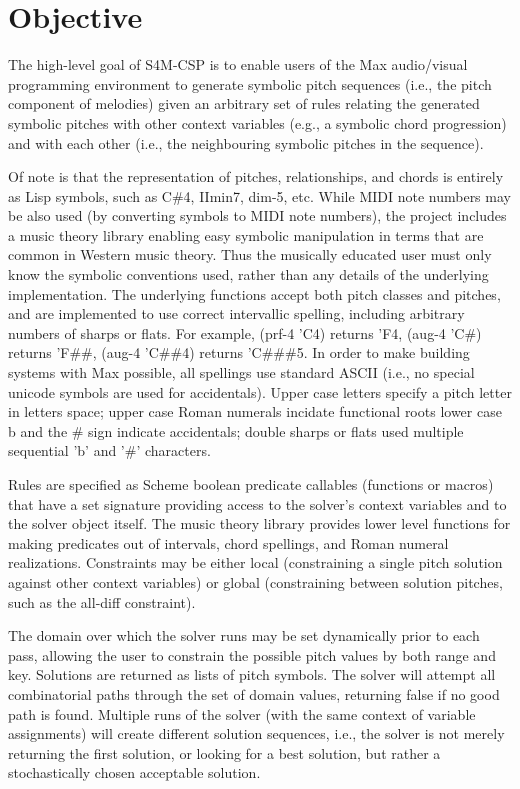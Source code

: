 \documentclass[pmlr]{jmlr}%
\begin{document}
\section{Objective}
\label{sec:intro}

The high-level goal of S4M-CSP is to enable users of the Max audio/visual 
programming environment to generate symbolic pitch sequences (i.e., the pitch component of melodies) 
given an arbitrary set of rules relating the generated symbolic pitches with other context
variables (e.g., a symbolic chord progression) and with each other (i.e., the neighbouring
symbolic pitches in the sequence). 

Of note is that the representation of pitches, relationships, and chords is entirely as Lisp symbols,
such as C\#4, IImin7, dim-5, etc. While MIDI note numbers may be also used (by converting symbols to MIDI note numbers),
the project includes a music theory library enabling easy symbolic manipulation in terms that are 
common in Western music theory.  Thus the musically educated user must only know the symbolic 
conventions used, rather than any details of the underlying implementation. The underlying functions
accept both pitch classes and pitches, and are implemented to use correct intervallic spelling, including
arbitrary numbers of sharps or flats. 
For example, (prf-4 'C4) returns 'F4, (aug-4 'C\#) returns 'F\#\#, (aug-4 'C\#\#4) returns 'C\#\#\#5.
In order to make building systems with Max possible, all spellings use standard ASCII 
(i.e., no special unicode symbols are used for accidentals).
Upper case letters specify a pitch letter in letters space;
upper case Roman numerals incidate functional roots
lower case b and the \# sign indicate accidentals;
double sharps or flats used multiple sequential 'b' and '\#' characters.

Rules are specified as Scheme boolean predicate callables (functions or macros) that have a set
signature providing access to the solver's context variables and to the solver object
itself. The music theory library provides lower level functions for making predicates 
out of intervals, chord spellings, and Roman numeral realizations. 
Constraints may be either local (constraining a single pitch solution against other context variables)
or global (constraining between solution pitches, such as the all-diff constraint). 

The domain over which the solver runs may be set dynamically prior to each pass, allowing the
user to constrain the possible pitch values by both range and key.
Solutions are returned as lists of pitch symbols. 
The solver will attempt all combinatorial paths through the set of domain values, returning
false if no good path is found.  
Multiple runs of the solver (with the same context of variable assignments) will create different
solution sequences, i.e., the solver is not merely returning the first solution, or looking
for a best solution, but rather a stochastically chosen acceptable solution.
\end{document}
